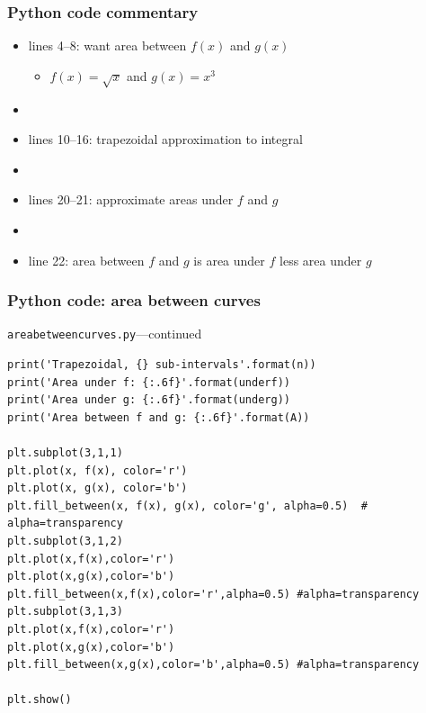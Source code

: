 \documentclass[english,14pt]{beamer}
\begin{document}

\begin{frame}[fragile]

\frametitle{Python code commentary}

\begin{itemize}
	\item lines 4--8: want area between $f(x)$ and $g(x)$
	\begin{itemize}
		\item $f(x) = \sqrt{x}$ and $g(x) = x^3$
	\end{itemize}
	\item[]
	\item lines 10--16: trapezoidal approximation to integral
	\item[]
	\item lines 20--21: approximate areas under $f$ and $g$
	\item[]
	\item line 22: area between $f$ and $g$ is area under $f$ less area under $g$
\end{itemize}

\end{frame}


\begin{frame}[fragile]

\frametitle{Python code: area between curves}
\vspace*{-3mm}
{\small
\texttt{areabetweencurves.py}}---continued
\vspace*{-2mm}
\begin{lstlisting}[style=CStyle,basicstyle=\scriptsize]
print('Trapezoidal, {} sub-intervals'.format(n))
print('Area under f: {:.6f}'.format(underf))
print('Area under g: {:.6f}'.format(underg))
print('Area between f and g: {:.6f}'.format(A))

plt.subplot(3,1,1)
plt.plot(x, f(x), color='r')
plt.plot(x, g(x), color='b')
plt.fill_between(x, f(x), g(x), color='g', alpha=0.5)  # alpha=transparency
plt.subplot(3,1,2)
plt.plot(x,f(x),color='r')
plt.plot(x,g(x),color='b')
plt.fill_between(x,f(x),color='r',alpha=0.5) #alpha=transparency
plt.subplot(3,1,3)
plt.plot(x,f(x),color='r')
plt.plot(x,g(x),color='b')
plt.fill_between(x,g(x),color='b',alpha=0.5) #alpha=transparency

plt.show()
\end{lstlisting}

\end{frame}
\end{document}
